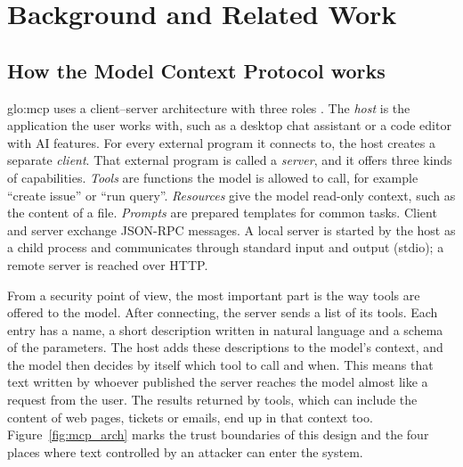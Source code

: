 \chapter{Background and Related Work}

\section{How the Model Context Protocol works}

\par \acrshort{glo:mcp} uses a client--server architecture with three roles \cite{mcpspec2026}. The \textit{host} is the application the user works with, such as a desktop chat assistant or a code editor with AI features. For every external program it connects to, the host creates a separate \textit{client}. That external program is called a \textit{server}, and it offers three kinds of capabilities. \textit{Tools} are functions the model is allowed to call, for example ``create issue'' or ``run query''. \textit{Resources} give the model read-only context, such as the content of a file. \textit{Prompts} are prepared templates for common tasks. Client and server exchange JSON-RPC messages. A local server is started by the host as a child process and communicates through standard input and output (stdio); a remote server is reached over HTTP.

\par From a security point of view, the most important part is the way tools are offered to the model. After connecting, the server sends a list of its tools. Each entry has a name, a short description written in natural language and a schema of the parameters. The host adds these descriptions to the model's context, and the model then decides by itself which tool to call and when. This means that text written by whoever published the server reaches the model almost like a request from the user. The results returned by tools, which can include the content of web pages, tickets or emails, end up in that context too. Figure~\ref{fig:mcp_arch} marks the trust boundaries of this design and the four places where text controlled by an attacker can enter the system.

